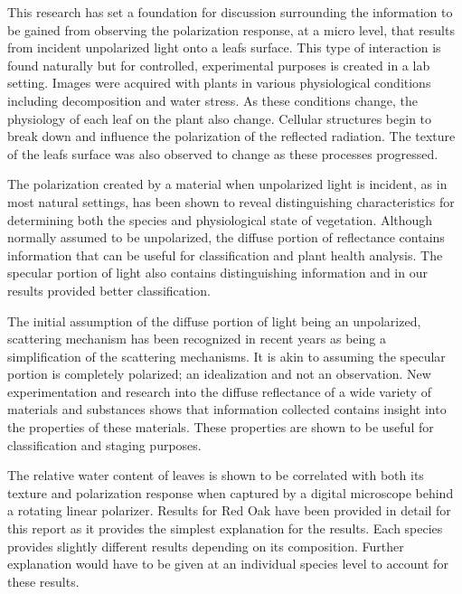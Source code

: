 This research has set a foundation for discussion surrounding the information to be gained from observing the polarization response, at a micro level, that results from incident unpolarized light onto a leafs surface.  This type of interaction is found naturally but for controlled, experimental purposes is created in a lab setting. Images were acquired with plants in various physiological conditions including decomposition and water stress.  As these conditions change, the physiology of each leaf on the plant also change.  Cellular structures begin to break down and influence the polarization of the reflected radiation.  The texture of the leafs surface was also observed to change as these processes progressed.

The polarization created by a material when unpolarized light is incident, as in most natural settings, has been shown to reveal distinguishing characteristics for determining both the species and physiological state of vegetation.  Although normally assumed to be unpolarized, the diffuse portion of reflectance contains information that can be useful for classification and plant health analysis.  The specular portion of light also contains distinguishing information and in our results provided better classification.

The initial assumption of the diffuse portion of light being an unpolarized, scattering mechanism has been recognized in recent years as being a simplification of the scattering mechanisms.  It is akin to assuming the specular portion is completely polarized; an idealization and not an observation.  New experimentation and research into the diffuse reflectance of a wide variety of materials and substances shows that information collected contains insight into the properties of these materials. These properties are shown to be useful for classification and staging purposes.

The relative water content of leaves is shown to be correlated with both its texture and polarization response when captured by a digital microscope behind a rotating linear polarizer. Results for Red Oak have been provided in detail for this report as it provides the simplest explanation for the results.  Each species provides slightly different results depending on its composition.  Further explanation would have to be given at an individual species level to account for these results.

